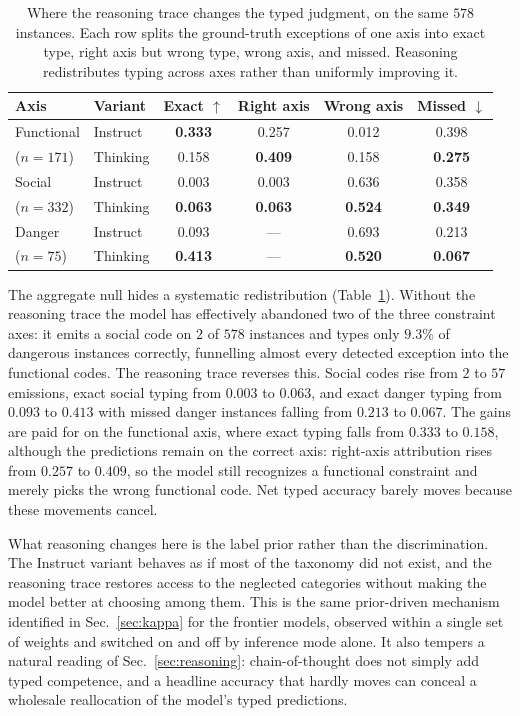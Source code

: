 \documentclass[runningheads]{llncs}
\begin{document}
\begin{table}[t]
  \centering
  \footnotesize
  \setlength{\tabcolsep}{4pt}
  \caption{Where the reasoning trace changes the typed judgment, on the same $578$ instances. Each row splits the ground-truth exceptions of one axis into exact type, right axis but wrong type, wrong axis, and missed. Reasoning redistributes typing across axes rather than uniformly improving it.}
  \label{tab:cotaxis}
  \begin{tabular}{llcccc}
    \toprule
    Axis & Variant & Exact $\uparrow$ & Right axis & Wrong axis & Missed $\downarrow$ \\
    \midrule
    Functional  & Instruct & \textbf{0.333} & 0.257 & 0.012 & 0.398 \\
    ($n{=}171$) & Thinking & 0.158 & \textbf{0.409} & 0.158 & \textbf{0.275} \\
    \midrule
    Social      & Instruct & 0.003 & 0.003 & 0.636 & 0.358 \\
    ($n{=}332$) & Thinking & \textbf{0.063} & \textbf{0.063} & \textbf{0.524} & \textbf{0.349} \\
    \midrule
    Danger      & Instruct & 0.093 & --- & 0.693 & 0.213 \\
    ($n{=}75$)  & Thinking & \textbf{0.413} & --- & \textbf{0.520} & \textbf{0.067} \\
    \bottomrule
  \end{tabular}
\end{table}

The aggregate null hides a systematic redistribution (Table~\ref{tab:cotaxis}).
Without the reasoning trace the model has effectively abandoned two of the three constraint axes: it emits a social code on $2$ of $578$ instances and types only $9.3\%$ of dangerous instances correctly, funnelling almost every detected exception into the functional codes.
The reasoning trace reverses this.
Social codes rise from $2$ to $57$ emissions, exact social typing from $0.003$ to $0.063$, and exact danger typing from $0.093$ to $0.413$ with missed danger instances falling from $0.213$ to $0.067$.
The gains are paid for on the functional axis, where exact typing falls from $0.333$ to $0.158$, although the predictions remain on the correct axis: right-axis attribution rises from $0.257$ to $0.409$, so the model still recognizes a functional constraint and merely picks the wrong functional code.
Net typed accuracy barely moves because these movements cancel.

What reasoning changes here is the label prior rather than the discrimination.
The Instruct variant behaves as if most of the taxonomy did not exist, and the reasoning trace restores access to the neglected categories without making the model better at choosing among them.
This is the same prior-driven mechanism identified in Sec.~\ref{sec:kappa} for the frontier models, observed within a single set of weights and switched on and off by inference mode alone.
It also tempers a natural reading of Sec.~\ref{sec:reasoning}: chain-of-thought does not simply add typed competence, and a headline accuracy that hardly moves can conceal a wholesale reallocation of the model's typed predictions.
\end{document}
